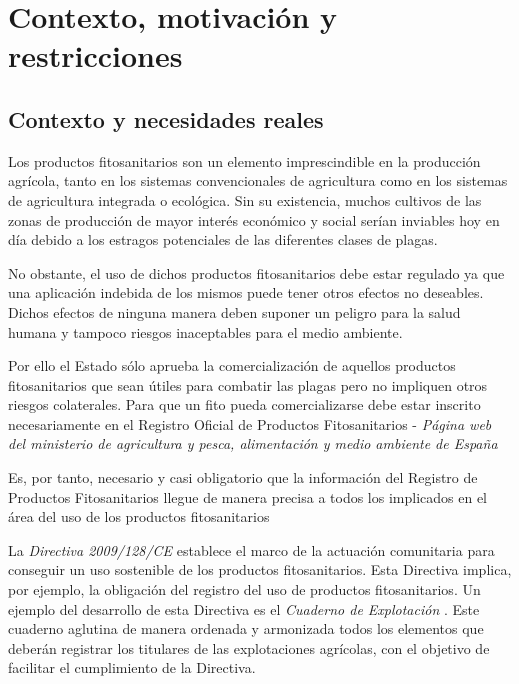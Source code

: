 \chapter{Contexto, motivación y restricciones} \label{phytoscheme}
\section{Contexto y necesidades reales} \label{phytoscheme.contexto}
Los productos fitosanitarios son un elemento imprescindible en la producción agrícola, tanto en los sistemas convencionales de agricultura como en los sistemas de agricultura integrada o ecológica. Sin su existencia, muchos cultivos de las zonas de producción de mayor interés económico y social serían inviables hoy en día debido a los estragos potenciales de las diferentes clases de plagas.\par
No obstante, el uso de dichos productos fitosanitarios debe estar regulado ya que una aplicación indebida de los mismos puede tener otros efectos no deseables. Dichos efectos de ninguna manera deben suponer un peligro para la salud humana y tampoco riesgos inaceptables para el medio ambiente. \par
Por ello el Estado sólo aprueba la comercialización de aquellos productos fitosanitarios que sean útiles para combatir las plagas pero no impliquen otros riesgos colaterales. Para que un \gls{fito} pueda comercializarse debe estar inscrito necesariamente en el Registro Oficial de Productos Fitosanitarios - \textit{Página web del ministerio de agricultura y pesca, alimentación y medio ambiente de España} \cite{mapama}\par
Es, por tanto, necesario y casi obligatorio que la información del Registro de Productos Fitosanitarios llegue de manera precisa a todos los implicados en el área del uso de los productos fitosanitarios\par
La \textit{Directiva 2009/128/CE} \cite{directiva128} establece el marco de la actuación comunitaria para conseguir un uso sostenible de los productos fitosanitarios. Esta Directiva implica, por ejemplo, la obligación del registro del uso de productos fitosanitarios. Un ejemplo del desarrollo de esta Directiva es el \textit{Cuaderno de Explotación} \cite{cuadernoexplotacion}. Este cuaderno aglutina de manera ordenada y armonizada todos los elementos que deberán registrar los titulares de las explotaciones agrícolas, con el objetivo de facilitar el cumplimiento de la Directiva.\par
